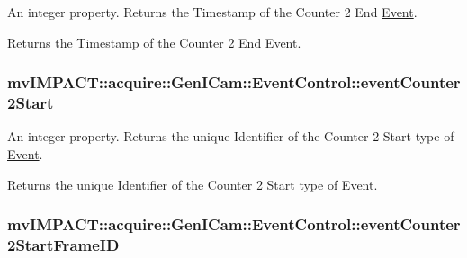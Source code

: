An integer property. Returns the Timestamp of the Counter 2 End \hyperlink{classmv_i_m_p_a_c_t_1_1acquire_1_1_event}{Event}. 

Returns the Timestamp of the Counter 2 End \hyperlink{classmv_i_m_p_a_c_t_1_1acquire_1_1_event}{Event}. \hypertarget{classmv_i_m_p_a_c_t_1_1acquire_1_1_gen_i_cam_1_1_event_control_ae7e6a99ce8b6d55496162441a595fbc4}{
\subsubsection[{event\+Counter2\+Start}]{ mv\+I\+M\+P\+A\+C\+T\+::acquire\+::\+Gen\+I\+Cam\+::\+Event\+Control\+::event\+Counter2\+Start}}\label{classmv_i_m_p_a_c_t_1_1acquire_1_1_gen_i_cam_1_1_event_control_ae7e6a99ce8b6d55496162441a595fbc4}


An integer property. Returns the unique Identifier of the Counter 2 Start type of \hyperlink{classmv_i_m_p_a_c_t_1_1acquire_1_1_event}{Event}. 

Returns the unique Identifier of the Counter 2 Start type of \hyperlink{classmv_i_m_p_a_c_t_1_1acquire_1_1_event}{Event}. \hypertarget{classmv_i_m_p_a_c_t_1_1acquire_1_1_gen_i_cam_1_1_event_control_ac4441f07bb55011f2da31682a29ada4c}{
\subsubsection[{event\+Counter2\+Start\+Frame\+I\+D}]{ mv\+I\+M\+P\+A\+C\+T\+::acquire\+::\+Gen\+I\+Cam\+::\+Event\+Control\+::event\+Counter2\+Start\+Frame\+I\+D}}\label{classmv_i_m_p_a_c_t_1_1acquire_1_1_gen_i_cam_1_1_event_control_ac4441f07bb55011f2da31682a29ada4c}


